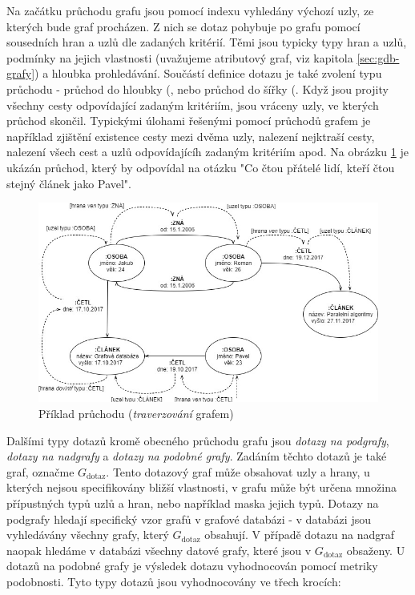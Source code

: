 Na začátku průchodu grafu jsou pomocí indexu vyhledány výchozí uzly, ze kterých bude graf procházen. Z nich se dotaz pohybuje po grafu pomocí sousedních hran a uzlů dle zadaných kritérií. Těmi jsou typicky typy hran a uzlů, podmínky na jejich vlastnosti (uvažujeme atributový graf, viz kapitola \ref{sec:gdb-grafy}) a hloubka prohledávání. Součástí definice dotazu je také zvolení typu průchodu - průchod do hloubky (\textit{}, nebo průchod do šířky (\textit{}. Když jsou projity všechny cesty odpovídající zadaným kritériím, jsou vráceny uzly, ve kterých průchod skončil. Typickými úlohami řešenými pomocí průchodů grafem je například zjištění existence cesty mezi dvěma uzly, nalezení nejktraší cesty, nalezení všech cest a uzlů odpovídajícíh zadaným kritériím apod. Na obrázku \ref{fig:traversal} je ukázán průchod, který by odpovídal na otázku "Co čtou přátelé lidí, kteří čtou stejný článek jako Pavel".

\begin{figure}
\begin{center}
\includegraphics[width=14cm]{figures/traversal}
\caption{Příklad průchodu (\textit{traverzování} grafem)}
\label{fig:traversal}
\end{center}
\end{figure}

Dalšími typy dotazů kromě obecného průchodu grafu jsou \textit{dotazy na podgrafy}, \textit{dotazy na nadgrafy} a \textit{dotazy na podobné grafy}. Zadáním těchto dotazů je také graf, označme \textit{$G_\mathrm{dotaz}$}. Tento dotazový graf může obsahovat uzly a hrany, u kterých nejsou specifikovány bližší vlastnosti, v grafu může být určena množina přípustných typů uzlů a hran, nebo například maska jejich typů. Dotazy na podgrafy hledají specifický vzor grafů v grafové databázi - v databázi jsou vyhledávány všechny grafy, který \textit{$G_\mathrm{dotaz}$} obsahují. V případě dotazu na nadgraf naopak hledáme v databázi všechny datové grafy, které jsou v \textit{$G_\mathrm{dotaz}$} obsaženy. U dotazů na podobné grafy je výsledek dotazu vyhodnocován pomocí metriky podobnosti.\cite{Koutra11} Tyto typy dotazů jsou vyhodnocovány ve třech krocích:

